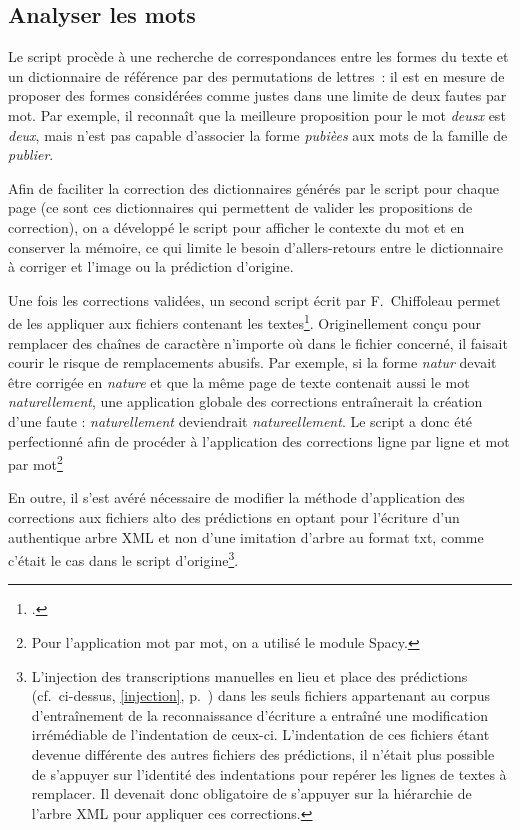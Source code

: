 \documentclass[a4paper,12pt,twoside]{book}
\begin{document}
			\subsection{Analyser les mots}
				Le script procède à une recherche de correspondances entre les formes du texte et un dictionnaire de référence par des permutations de lettres~: il est en mesure de proposer des formes considérées comme justes dans une limite de deux fautes par mot. Par exemple, il reconnaît que la meilleure proposition pour le mot \textit{deusx} est \textit{deux}, mais n'est pas capable d'associer la forme \textit{pubièes} aux mots de la famille de \textit{publier}.
						
				Afin de faciliter la correction des dictionnaires générés par le script pour chaque page (ce sont ces dictionnaires qui permettent de valider les propositions de correction), on a développé le script pour afficher le contexte du mot et en conserver la mémoire, ce qui limite le besoin d'allers-retours entre le dictionnaire à corriger et l'image ou la prédiction d'origine.
				
				Une fois les corrections validées, un second script écrit par F.~Chiffoleau permet de les appliquer aux fichiers contenant les textes\footcite{biayTextCorrectionPy2022}. Originellement conçu pour remplacer des chaînes de caractère n'importe où dans le fichier concerné, il faisait courir le risque de remplacements abusifs. Par exemple, si la forme \textit{natur} devait être corrigée en \textit{nature} et que la même page de texte contenait aussi le mot \textit{naturellement}, une application globale des corrections entraînerait la création d'une faute : \textit{naturellement} deviendrait \textit{natureellement}. Le script a donc été perfectionné afin de procéder à l'application des corrections ligne par ligne et mot par mot\footnote{Pour l'application mot par mot, on a utilisé le module Spacy\cite{SpaCyIndustrialstrengthNatural}.}
				
				En outre, il s'est avéré nécessaire de modifier la méthode d'application des corrections aux fichiers \gls{alto} des prédictions en optant pour l'écriture d'un authentique arbre XML et non d'une imitation d'arbre au format \textsf{txt}, comme c'était le cas dans le script d'origine\footnote{L'injection des transcriptions manuelles en lieu et place des prédictions (cf.~ci-dessus, \ref{injection}, p.~\pageref{injection}) dans les seuls fichiers appartenant au corpus d'entraînement de la reconnaissance d'écriture a entraîné une modification irrémédiable de l'indentation de ceux-ci. L'indentation de ces fichiers étant devenue différente des autres fichiers des prédictions, il n'était plus possible de s'appuyer sur l'identité des indentations pour repérer les lignes de textes à remplacer. Il devenait donc obligatoire de s'appuyer sur la hiérarchie de l'arbre XML pour appliquer ces corrections.}.
								
\end{document}
